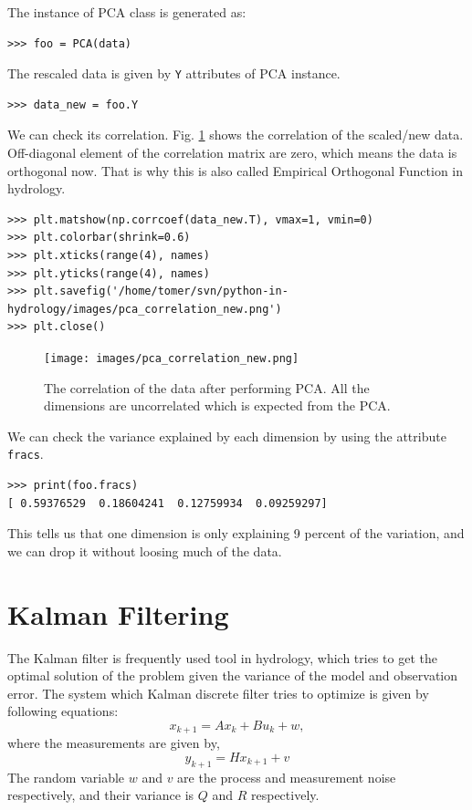 \documentclass[10pt]{book}
\begin{document}
The instance of PCA class is generated as:
\beforeverb \begin{verbatim}
>>> foo = PCA(data)
\end{verbatim} \afterverb

The rescaled data is given by \verb"Y" attributes of PCA instance.
\beforeverb \begin{verbatim}
>>> data_new = foo.Y
\end{verbatim} \afterverb

We can check its correlation. Fig. \ref{fig:pca_2} shows the correlation of the scaled/new data. Off-diagonal element of the correlation matrix are zero, which means the data is orthogonal now. That is why this is also called Empirical Orthogonal Function in hydrology. 
\beforeverb \begin{verbatim}
>>> plt.matshow(np.corrcoef(data_new.T), vmax=1, vmin=0)
>>> plt.colorbar(shrink=0.6)
>>> plt.xticks(range(4), names)
>>> plt.yticks(range(4), names)
>>> plt.savefig('/home/tomer/svn/python-in-hydrology/images/pca_correlation_new.png')
>>> plt.close()
\end{verbatim} \afterverb

\beforefig
\begin{figure}[h!]
  \centering
    \texttt{[image: images/pca\_correlation\_new.png]}
  \caption{The correlation of the data after performing PCA. All the dimensions are uncorrelated which is expected from the PCA.}
   \label{fig:pca_2}
\end{figure}
\afterfig

We can check the variance explained by each dimension by using the attribute \verb"fracs".
\beforeverb \begin{verbatim}
>>> print(foo.fracs)
[ 0.59376529  0.18604241  0.12759934  0.09259297]
\end{verbatim} \afterverb
This tells us that one dimension is only explaining 9 percent of the variation, and we can drop it without loosing much of the data.

\section{Kalman Filtering}
The Kalman filter is frequently used tool in hydrology, which tries to get the optimal solution of the problem given the variance of the model and observation error. The system which Kalman discrete filter tries to optimize is given by following equations:
\begin{equation}
x_{k+1} = Ax_k + Bu_k + w,
\end{equation}
where the measurements are given by,
\begin{equation}
y_{k+1} = Hx_{k+1} + v
\end{equation}
The random variable $w$ and $v$ are the process and measurement noise respectively, and their variance is $Q$ and $R$ respectively. 
\end{document}
